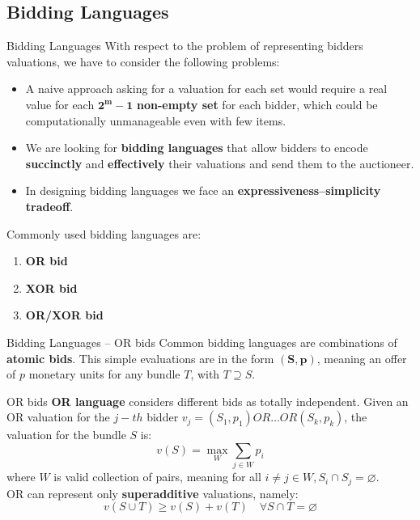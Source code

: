 \documentclass[aspectratio=169,xcolor=dvipsnames]{beamer}
\begin{document}
    \subsection{Bidding Languages}
    \begin{frame}{Bidding Languages}
    With respect to the problem of representing bidders valuations, we have to consider the following problems:
        \begin{itemize}
        \item A naive approach asking for a valuation for each set would require a real value for each $\mathbf{2^m -1}$ \textbf{non-empty set} for each bidder, which could be computationally unmanageable even with few items.
        \item We are looking for \textbf{bidding languages} that allow bidders to encode \textbf{succinctly} and  \textbf{effectively} their valuations and send them to the auctioneer. 
        \item In designing bidding languages we face an \textbf{expressiveness–simplicity tradeoff}.
    \end{itemize}
    Commonly used bidding languages are:
            \begin{enumerate}
                \item \textbf{OR bid}
                \item \textbf{XOR bid}
                \item \textbf{OR/XOR bid}
            \end{enumerate}
    \end{frame}
    
    \begin{frame}{Bidding Languages – OR bids}
    Common bidding languages are combinations of \textbf{atomic bids}. This simple evaluations are in the form $\boldsymbol{(S,p)}$, meaning an offer of $p$ monetary units for any bundle $T$, with $T \supseteq S$.
    \begin{block}{OR bids}
    \textbf{OR language} considers different bids as totally independent. Given an OR valuation for the $j-th$ bidder $v_{j} = (S_1, p_{1})OR \dotsc OR  (S_k, p_{k})$, the valuation for the bundle $S$ is:  
    $$
    v(S) = \max_{W} \sum_{j \in W} p_i
    $$
    where $W$ is valid collection of pairs, meaning for all $i \neq j \in W, S_i \cap S_j = \varnothing$. \\
    \smallskip
    OR can represent only \textbf{superadditive} valuations, namely:
    $$
     v(S \cup T) \geq v(S) + v(T) \quad \forall S \cap T = \varnothing
    $$
    \end{block}
    \end{frame}
    
\end{document}
